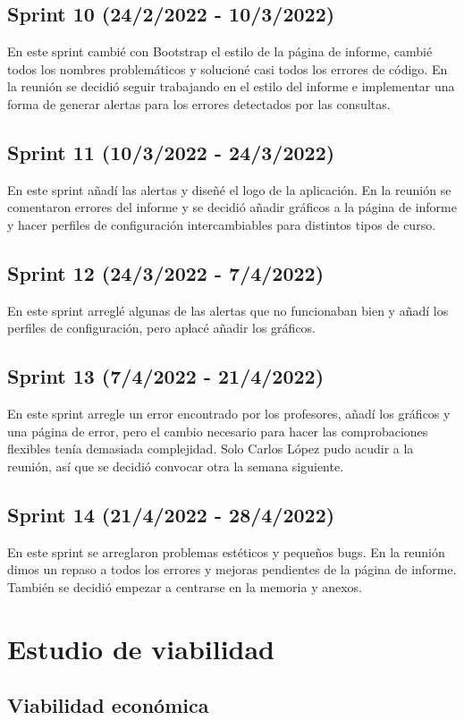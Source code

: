 \subsection{Sprint 10 (24/2/2022 - 10/3/2022)} 
	En este sprint cambié con Bootstrap el estilo de la página de informe, cambié todos los nombres problemáticos y solucioné casi todos los errores de código. En la reunión se decidió seguir trabajando en el estilo del informe e implementar una forma de generar alertas para los errores detectados por las consultas.
\subsection{Sprint 11 (10/3/2022 - 24/3/2022)} 
	En este sprint añadí las alertas y diseñé el logo de la aplicación. En la reunión se comentaron errores del informe y se decidió añadir gráficos a la página de informe y hacer perfiles de configuración intercambiables para distintos tipos de curso.
\subsection{Sprint 12 (24/3/2022 - 7/4/2022)} 
	En este sprint arreglé algunas de las alertas que no funcionaban bien y añadí los perfiles de configuración, pero aplacé añadir los gráficos.
\subsection{Sprint 13 (7/4/2022 - 21/4/2022)} 
	En este sprint arregle un error encontrado por los profesores, añadí los gráficos y una página de error, pero el cambio necesario para hacer las comprobaciones flexibles tenía demasiada complejidad. Solo Carlos López pudo acudir a la reunión, así que se decidió convocar otra la semana siguiente. 
\subsection{Sprint 14 (21/4/2022 - 28/4/2022)} 
	En este sprint se arreglaron problemas estéticos y pequeños bugs. En la reunión dimos un repaso a todos los errores y mejoras pendientes de la página de informe. También se decidió empezar a centrarse en la memoria y anexos.

\section{Estudio de viabilidad}

\subsection{Viabilidad económica}


